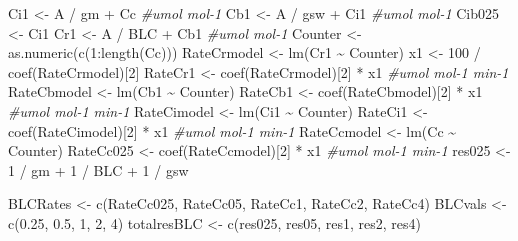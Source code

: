 \documentclass[
]{krantz}
\makeatletter
\newenvironment{Shaded}{\begin{snugshade}}{\end{snugshade}}
\newcommand{\CommentTok}[1]{\textcolor[rgb]{0.56,0.35,0.01}{\textit{#1}}}
\newcommand{\DecValTok}[1]{\textcolor[rgb]{0.00,0.00,0.81}{#1}}
\newcommand{\FloatTok}[1]{\textcolor[rgb]{0.00,0.00,0.81}{#1}}
\newcommand{\FunctionTok}[1]{\textcolor[rgb]{0.00,0.00,0.00}{#1}}
\newcommand{\NormalTok}[1]{#1}
\newcommand{\OtherTok}[1]{\textcolor[rgb]{0.56,0.35,0.01}{#1}}
\newcommand{\SpecialCharTok}[1]{\textcolor[rgb]{0.00,0.00,0.00}{#1}}
\newenvironment{kframe}{%
\medskip{}
\setlength{\fboxsep}{.8em}
 \def\at@end@of@kframe{}%
 \ifinner\ifhmode%
  \def\at@end@of@kframe{\end{minipage}}%
  \begin{minipage}{\columnwidth}%
 \fi\fi%
 \def\FrameCommand##1{\hskip\@totalleftmargin \hskip-\fboxsep
 \colorbox{shadecolor}{##1}\hskip-\fboxsep
     \hskip-\linewidth \hskip-\@totalleftmargin \hskip\columnwidth}%
 \MakeFramed {\advance\hsize-\width
   \@totalleftmargin\z@ \linewidth\hsize
   \@setminipage}}%
 {\par\unskip\endMakeFramed%
 \at@end@of@kframe}
\renewenvironment{Shaded}{\begin{kframe}}{\end{kframe}}
\makeatother
\begin{document}
\begin{Shaded}
\begin{Highlighting}[]
\NormalTok{Ci1 }\OtherTok{\textless{}{-}}\NormalTok{ A }\SpecialCharTok{/}\NormalTok{ gm }\SpecialCharTok{+}\NormalTok{ Cc }\CommentTok{\#umol mol{-}1}
\NormalTok{Cb1 }\OtherTok{\textless{}{-}}\NormalTok{ A }\SpecialCharTok{/}\NormalTok{ gsw }\SpecialCharTok{+}\NormalTok{ Ci1 }\CommentTok{\#umol mol{-}1}
\NormalTok{Cib025 }\OtherTok{\textless{}{-}}\NormalTok{ Ci1}
\NormalTok{Cr1 }\OtherTok{\textless{}{-}}\NormalTok{ A }\SpecialCharTok{/}\NormalTok{ BLC }\SpecialCharTok{+}\NormalTok{ Cb1 }\CommentTok{\#umol mol{-}1}
\NormalTok{Counter }\OtherTok{\textless{}{-}} \FunctionTok{as.numeric}\NormalTok{(}\FunctionTok{c}\NormalTok{(}\DecValTok{1}\SpecialCharTok{:}\FunctionTok{length}\NormalTok{(Cc)))}
\NormalTok{RateCrmodel }\OtherTok{\textless{}{-}} \FunctionTok{lm}\NormalTok{(Cr1 }\SpecialCharTok{\textasciitilde{}}\NormalTok{ Counter)}
\NormalTok{x1 }\OtherTok{\textless{}{-}} \DecValTok{100} \SpecialCharTok{/} \FunctionTok{coef}\NormalTok{(RateCrmodel)[}\DecValTok{2}\NormalTok{]}
\NormalTok{RateCr1 }\OtherTok{\textless{}{-}} \FunctionTok{coef}\NormalTok{(RateCrmodel)[}\DecValTok{2}\NormalTok{] }\SpecialCharTok{*}\NormalTok{ x1 }\CommentTok{\#umol mol{-}1 min{-}1}
\NormalTok{RateCbmodel }\OtherTok{\textless{}{-}} \FunctionTok{lm}\NormalTok{(Cb1 }\SpecialCharTok{\textasciitilde{}}\NormalTok{ Counter)}
\NormalTok{RateCb1 }\OtherTok{\textless{}{-}} \FunctionTok{coef}\NormalTok{(RateCbmodel)[}\DecValTok{2}\NormalTok{] }\SpecialCharTok{*}\NormalTok{ x1 }\CommentTok{\#umol mol{-}1 min{-}1}
\NormalTok{RateCimodel }\OtherTok{\textless{}{-}} \FunctionTok{lm}\NormalTok{(Ci1 }\SpecialCharTok{\textasciitilde{}}\NormalTok{ Counter)}
\NormalTok{RateCi1 }\OtherTok{\textless{}{-}} \FunctionTok{coef}\NormalTok{(RateCimodel)[}\DecValTok{2}\NormalTok{] }\SpecialCharTok{*}\NormalTok{ x1 }\CommentTok{\#umol mol{-}1 min{-}1}
\NormalTok{RateCcmodel }\OtherTok{\textless{}{-}} \FunctionTok{lm}\NormalTok{(Cc }\SpecialCharTok{\textasciitilde{}}\NormalTok{ Counter)}
\NormalTok{RateCc025 }\OtherTok{\textless{}{-}} \FunctionTok{coef}\NormalTok{(RateCcmodel)[}\DecValTok{2}\NormalTok{] }\SpecialCharTok{*}\NormalTok{ x1 }\CommentTok{\#umol mol{-}1 min{-}1}
\NormalTok{res025 }\OtherTok{\textless{}{-}} \DecValTok{1} \SpecialCharTok{/}\NormalTok{ gm }\SpecialCharTok{+} \DecValTok{1} \SpecialCharTok{/}\NormalTok{ BLC }\SpecialCharTok{+} \DecValTok{1} \SpecialCharTok{/}\NormalTok{ gsw}

\NormalTok{BLCRates }\OtherTok{\textless{}{-}} \FunctionTok{c}\NormalTok{(RateCc025, RateCc05, RateCc1, RateCc2, RateCc4)}
\NormalTok{BLCvals }\OtherTok{\textless{}{-}} \FunctionTok{c}\NormalTok{(}\FloatTok{0.25}\NormalTok{, }\FloatTok{0.5}\NormalTok{, }\DecValTok{1}\NormalTok{, }\DecValTok{2}\NormalTok{, }\DecValTok{4}\NormalTok{)}
\NormalTok{totalresBLC }\OtherTok{\textless{}{-}} \FunctionTok{c}\NormalTok{(res025, res05, res1, res2, res4)}


\end{Highlighting}
\end{Shaded}
\end{document}
